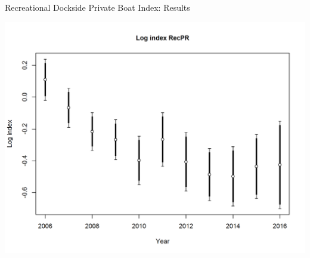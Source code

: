 \documentclass[ignorenonframetext,compress]{beamer}
\begin{document}
\begin{frame}{Recreational Dockside Private Boat Index: Results}

\centering
\includegraphics{r4ss/plots_mod1/index4_logcpuedata_RecPR.png}

\end{frame}
\end{document}
